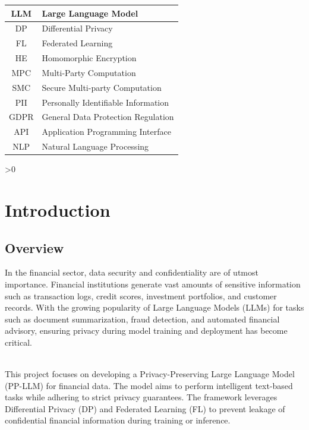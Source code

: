 \documentclass[12pt,a4paper]{report}
\let\oldchapter\chapter
\renewcommand{\chapter}{\ifnum\value{chapter}>0 \clearpage\pagestyle{fancy}\fi\oldchapter}
\begin{document}
\vspace{0.5cm}
\begin{center}
\begin{tabular}{|c|p{13cm}|}
\hline
LLM & Large Language Model \\
\hline
DP & Differential Privacy \\
\hline
FL & Federated Learning \\
\hline
HE & Homomorphic Encryption \\
\hline
MPC & Multi-Party Computation \\
\hline
SMC & Secure Multi-party Computation \\
\hline
PII & Personally Identifiable Information \\
\hline
GDPR & General Data Protection Regulation \\
\hline
API & Application Programming Interface \\
\hline
NLP & Natural Language Processing \\
\hline
\end{tabular}
\end{center}

\newpage

\clearpage
{}

\chapter{Introduction}
\section{Overview}
In the financial sector, data security and confidentiality are of utmost importance. Financial institutions generate vast amounts of sensitive information such as transaction logs, credit scores, investment portfolios, and customer records. With the growing popularity of Large Language Models (LLMs) for tasks such as document summarization, fraud detection, and automated financial advisory, ensuring privacy during model training and deployment has become critical.

\textbf \\This project focuses on developing a Privacy-Preserving Large Language Model (PP-LLM) for financial data. The model aims to perform intelligent text-based tasks while adhering to strict privacy guarantees. The framework leverages Differential Privacy (DP) and Federated Learning (FL) to prevent leakage of confidential financial information during training or inference.
\end{document}
